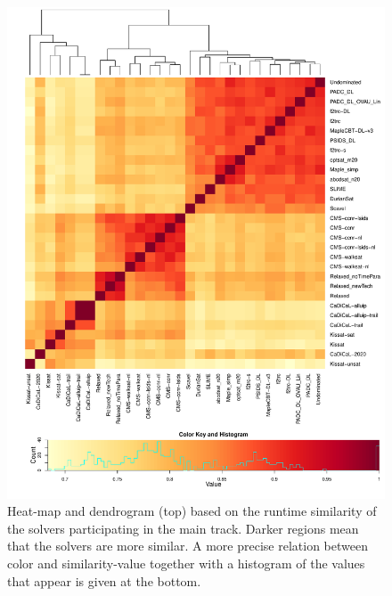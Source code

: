 \documentclass{elsarticle}
\begin{document}
\begin{figure}[tp]
    \centering
    \includegraphics[width=\linewidth]{similarity/cross.pdf}
    \caption{Heat-map and dendrogram (top) based on the runtime similarity of the solvers participating in the main track.
      Darker regions mean that the solvers are more similar.
      A more precise relation between color and similarity-value together with a histogram of the values that appear is given at the bottom.
    }
    \label{fig-similarity-main}
\end{figure}

\end{document}
